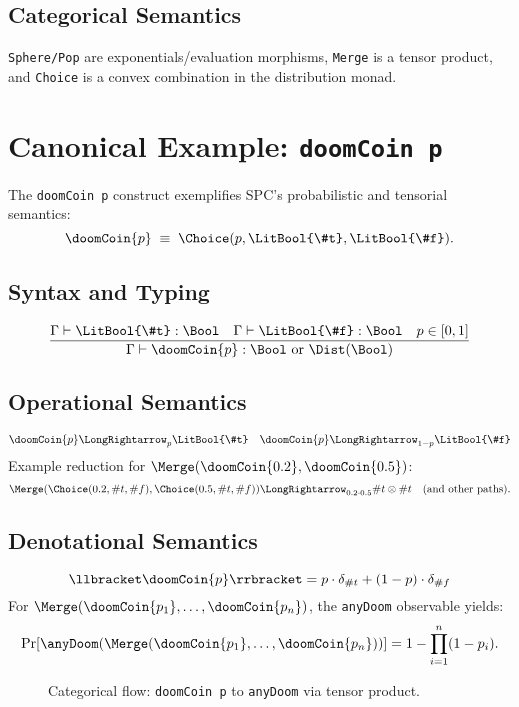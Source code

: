 \documentclass{article}
\begin{document}
\subsection{Categorical Semantics}
\texttt{Sphere/Pop} are exponentials/evaluation morphisms, \texttt{Merge} is a tensor product, and \texttt{Choice} is a convex combination in the distribution monad.

\section{Canonical Example: \texttt{doomCoin p}}
The \texttt{doomCoin p} construct exemplifies SPC’s probabilistic and tensorial semantics:
\[
\doomCoin{p} \;\equiv\; \Choice(p, \LitBool{\#t}, \LitBool{\#f}).
\]

\subsection{Syntax and Typing}
\[
\frac{\Gamma \vdash \LitBool{\#t} : \Bool \quad \Gamma \vdash \LitBool{\#f} : \Bool \quad p \in [0,1]}{\Gamma \vdash \doomCoin{p} : \Bool \text{ or } \Dist(\Bool)}
\]

\subsection{Operational Semantics}
\[
\doomCoin{p} \LongRightarrow_p \LitBool{\#t} \quad \doomCoin{p} \LongRightarrow_{1-p} \LitBool{\#f}
\]
Example reduction for $\Merge(\doomCoin{0.2}, \doomCoin{0.5})$:
\[
\Merge(\Choice(0.2, \#t, \#f), \Choice(0.5, \#t, \#f)) \LongRightarrow_{0.2 \cdot 0.5} \#t \otimes \#t \quad \text{(and other paths)}.
\]

\subsection{Denotational Semantics}
\[
\llbracket \doomCoin{p} \rrbracket = p \cdot \delta_{\#t} + (1-p) \cdot \delta_{\#f}
\]
For $\Merge(\doomCoin{p_1}, \ldots, \doomCoin{p_n})$, the \texttt{anyDoom} observable yields:
\[
\Pr[\anyDoom(\Merge(\doomCoin{p_1}, \ldots, \doomCoin{p_n}))] = 1 - \prod_{i=1}^n (1-p_i).
\]
\begin{figure}[h]
\centering
{}
\caption{Categorical flow: \texttt{doomCoin p} to \texttt{anyDoom} via tensor product.}
\end{figure}
\end{document}
